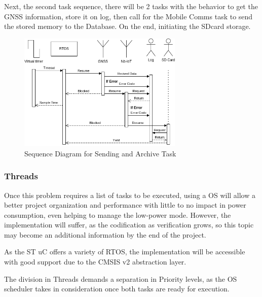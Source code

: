 Next, the second task sequence, there will be 2 tasks with the behavior to get the GNSS information, store it on log, then call for the Mobile Comms task to send the stored memory to the Database.
On the end, initiating the SDcard storage. 
\begin{figure}[H]
    \centering
    \includegraphics[width=0.7\textwidth]{images/diagrams/sequence_diagram/sequence_diagram_2/Sequence Diagram.drawio.png}  %
    \caption{Sequence Diagram for Sending and Archive Task}
    \label{fig:Sequence Diagram for Sending and Archive Task}        
\end{figure}

\subsubsection{Threads} 
Once this problem requires a list of tasks to be executed, using a OS will allow
a better project organization and performance with little to no impact in power consumption, 
even helping to manage the low-power mode. However, the implementation will suffer, as the
codification as verification grows, so this topic may become an additional information 
by the end of the project.

As the ST uC offers a variety of RTOS, the implementation will be accessible with good support due to the
CMSIS v2 abstraction layer.

The division in Threads demands a separation in Priority levels, as the OS scheduler takes in consideration 
once both tasks are ready for execution.  

